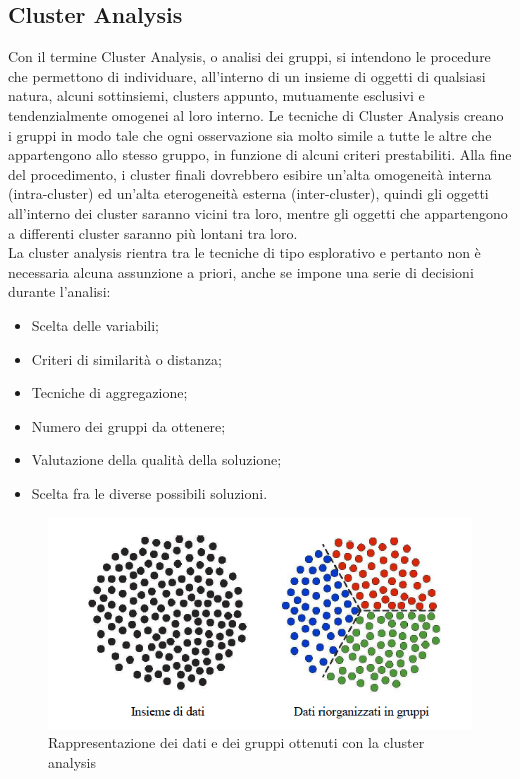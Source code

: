 \subsection{Cluster Analysis}
Con il termine Cluster Analysis, o analisi dei gruppi, si intendono le procedure che permettono di individuare, all'interno di un insieme di oggetti di qualsiasi natura, alcuni sottinsiemi, clusters appunto, mutuamente esclusivi e tendenzialmente omogenei al loro interno. Le tecniche di Cluster Analysis creano i gruppi in modo tale che ogni osservazione sia molto simile a tutte le altre che appartengono allo stesso gruppo, in funzione di alcuni criteri prestabiliti. Alla fine del procedimento, i cluster finali dovrebbero esibire un'alta omogeneità interna (intra-cluster) ed un'alta eterogeneità esterna (inter-cluster), quindi gli oggetti all'interno dei cluster saranno vicini tra loro, mentre gli oggetti che appartengono a differenti cluster saranno più lontani tra loro.\\
La cluster analysis rientra tra le tecniche di tipo esplorativo e pertanto non è necessaria alcuna assunzione a priori, anche se impone una serie di decisioni durante l'analisi:
\begin{itemize}
	\item Scelta delle variabili;
	\item Criteri di similarità o distanza;
	\item Tecniche di aggregazione;
	\item Numero dei gruppi da ottenere;
	\item Valutazione della qualità della soluzione;
	\item Scelta fra le diverse possibili soluzioni.
\end{itemize}
\begin{figure}[]
	\centering
	\includegraphics[scale=0.8]{images/Esempio_Cluster.png}
	\caption{Rappresentazione dei dati e dei gruppi ottenuti con la cluster analysis}
\end{figure}
